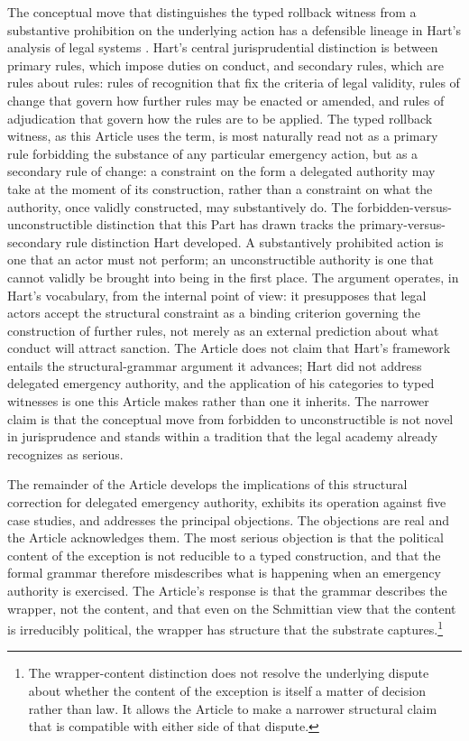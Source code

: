 The conceptual move that distinguishes the typed rollback witness from a substantive prohibition
on the underlying action has a defensible lineage in Hart's analysis of legal systems
\cite{TODO_hart_concept_of_law}.
Hart's central jurisprudential distinction is between primary rules, which impose duties on conduct,
and secondary rules, which are rules about rules: rules of recognition that fix the criteria of legal
validity, rules of change that govern how further rules may be enacted or amended, and rules of
adjudication that govern how the rules are to be applied.
The typed rollback witness, as this Article uses the term, is most naturally read not as a primary rule
forbidding the substance of any particular emergency action, but as a secondary rule of change:
a constraint on the form a delegated authority may take at the moment of its construction,
rather than a constraint on what the authority, once validly constructed, may substantively do.
The forbidden-versus-unconstructible distinction that this Part has drawn tracks the primary-versus-secondary
rule distinction Hart developed.
A substantively prohibited action is one that an actor must not perform; an unconstructible authority is one
that cannot validly be brought into being in the first place.
The argument operates, in Hart's vocabulary, from the internal point of view: it presupposes that legal actors
accept the structural constraint as a binding criterion governing the construction of further rules,
not merely as an external prediction about what conduct will attract sanction.
The Article does not claim that Hart's framework entails the structural-grammar argument it advances;
Hart did not address delegated emergency authority, and the application of his categories to typed witnesses
is one this Article makes rather than one it inherits.
The narrower claim is that the conceptual move from forbidden to unconstructible is not novel in jurisprudence
and stands within a tradition that the legal academy already recognizes as serious.

The remainder of the Article develops the implications of this structural correction for delegated
emergency authority,
exhibits its operation against five case studies,
and addresses the principal objections.
The objections are real and the Article acknowledges them.
The most serious objection is that the political content of the exception is not reducible to a typed
construction,
and that the formal grammar therefore misdescribes what is happening when an emergency authority is exercised.
The Article's response is that the grammar describes the wrapper, not the content,
and that even on the Schmittian view that the content is irreducibly political,
the wrapper has structure that the substrate captures.\footnote{%
The wrapper-content distinction does not resolve the underlying dispute about whether the content of the
exception is itself a matter of decision rather than law.
It allows the Article to make a narrower structural claim that is compatible with either side of that dispute.}
